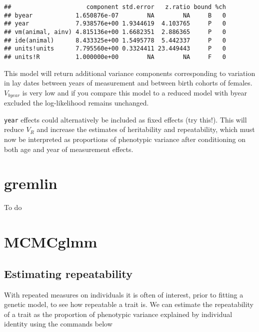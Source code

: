 \documentclass[
  12pt,
]{book}
\newenvironment{Shaded}{\begin{snugshade}}{\end{snugshade}}
\newcommand{\FunctionTok}[1]{\textcolor[rgb]{0.00,0.00,0.00}{#1}}
\newcommand{\NormalTok}[1]{#1}
\newcommand{\SpecialCharTok}[1]{\textcolor[rgb]{0.00,0.00,0.00}{#1}}
\begin{document}
\begin{Shaded}
\end{Shaded}

\begin{verbatim}
##                     component std.error   z.ratio bound %ch
## byear            1.650876e-07        NA        NA     B   0
## year             7.938576e+00 1.9344619  4.103765     P   0
## vm(animal, ainv) 4.815136e+00 1.6682351  2.886365     P   0
## ide(animal)      8.433325e+00 1.5495778  5.442337     P   0
## units!units      7.795560e+00 0.3324411 23.449443     P   0
## units!R          1.000000e+00        NA        NA     F   0
\end{verbatim}

This model will return additional variance components corresponding to variation in lay dates between years of measurement and between birth cohorts of females. \(V_{byear}\) is very low and if you compare this model to a reduced model with byear excluded the log-likelihood remains unchanged.

\texttt{year} effects could alternatively be included as fixed effects (try this!). This will reduce \(V_R\) and increase the estimates of heritability and repeatability, which must now be interpreted as proportions of phenotypic variance after conditioning on both age and year of measurement effects.

\hypertarget{gremlin-3}{%
\section{gremlin}\label{gremlin-3}}

To do

\hypertarget{mcmcglmm-3}{%
\section{MCMCglmm}\label{mcmcglmm-3}}

\hypertarget{estimating-repeatability-1}{%
\subsection{Estimating repeatability}\label{estimating-repeatability-1}}

With repeated measures on individuals it is often of interest, prior to fitting a genetic model, to see how repeatable a trait is. We can estimate the repeatability of a trait as the proportion of phenotypic variance explained by individual identity using the commands below
\end{document}
